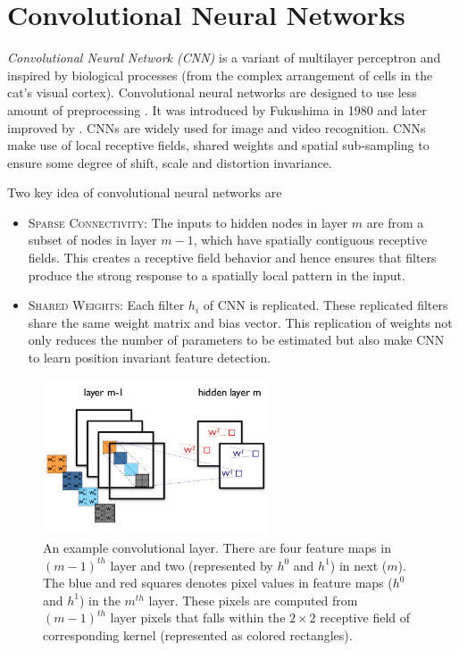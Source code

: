 \section{Convolutional Neural Networks}
\emph{Convolutional Neural Network (CNN)} is a variant of multilayer perceptron and inspired by biological processes (from the complex arrangement of cells in the cat's visual cortex). Convolutional neural networks are designed to use less amount of preprocessing \cite{lecun1998gradient}. It was introduced by Fukushima in 1980 and later improved by \citet{lecun1998gradient}. CNNs are widely used for image and video recognition. CNNs make use of local receptive fields, shared weights and spatial sub-sampling to ensure some degree of shift, scale and distortion invariance.

\noindent Two key idea of convolutional neural networks are
\begin{itemize}
\item \textsc{Sparse Connectivity:} The inputs to hidden nodes in layer $m$ are from a subset of nodes in layer $m-1$, which have spatially contiguous receptive fields. This creates a receptive field behavior and hence ensures that filters produce the strong response to a spatially local pattern in the input.


\item \textsc{Shared Weights:} Each filter $h_i$ of CNN is replicated. These replicated filters share the same weight matrix and bias vector. This replication of weights not only reduces the number of parameters to be estimated but also make CNN to learn position invariant feature detection.
\end{itemize}

\begin{figure}[!ht]
\centering
\includegraphics[width=0.6\textwidth]{./imgs/convolution.png} 
\caption[convolutional layer explained]{An example convolutional layer.  There are four feature maps in ${(m-1)}^{th}$ layer and two (represented by $h^0$ and $h^1$) in next ($m$). The blue and red squares denotes pixel values in feature maps ($h^0$ and $h^1$) in the $m^{th}$ layer. These pixels are computed from $(m-1)^{th}$ layer pixels that falls within the $2\times2$ receptive field of corresponding kernel (represented as colored rectangles).}
\label{fig:cnn_layer}
\end{figure}


